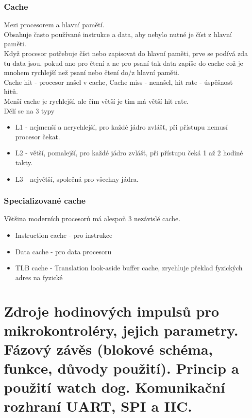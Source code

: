 \subsubsection*{Cache}
Mezi procesorem a hlavní pamětí. \\
Obsahuje často používané instrukce a data, aby nebylo nutné je číst z hlavní paměti. \\
Když procesor potřebuje číst nebo zapisovat do hlavní paměti, prve se podívá zda tu data jsou, pokud ano pro čtení a ne pro psaní tak data zapíše do cache což je mnohem rychlejší než psaní nebo čtení do/z hlavní paměti. \\
Cache hit - procesor našel v cache, Cache miss - nenašel, hit rate - úspěšnost hitů.\\
Menší cache je rychlejší, ale čím větší je tím má větší hit rate.\\
Dělí se na 3 typy
\begin{itemize}
    \item L1 - nejmenší a nerychlejší, pro každé jádro zvlášť, při přístupu nemusí procesor čekat.
    \item L2 - větší, pomalejší, pro každé jádro zvlášť, při přístupu čeká 1 až 2 hodiné takty.
    \item L3 - největší, společná pro všechny jádra.
\end{itemize}

\subsubsection*{Specializované cache}
Většina moderních procesorů má alespoň 3 nezávislé cache.\\
\begin{itemize}
    \item Instruction cache - pro instrukce
    \item Data cache - pro data procesoru
    \item TLB cache - Translation look-aside buffer cache, zrychluje překlad fyzických adres na fyzické
\end{itemize}

\section{Zdroje hodinových impulsů pro mikrokontroléry, jejich parametry. Fázový závěs (blokové schéma, funkce, důvody použití). Princip a použití watch dog. Komunikační rozhraní UART, SPI a IIC.}


